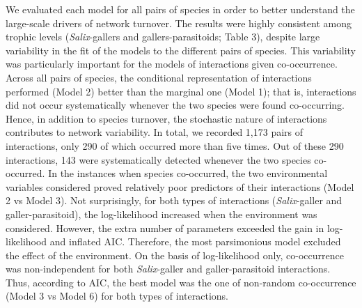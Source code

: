 \documentclass[12pt]{article}
\begin{document}
We evaluated each model for all pairs of species in order to better understand
the large-scale drivers of network turnover. The results were highly
consistent among trophic levels (\textit{Salix}-gallers and
gallers-parasitoids; Table 3), despite large variability in the fit
of the models to the different pairs of species. This variability was
particularly important for the models of interactions given co-occurrence.
Across all pairs of species, the conditional representation of interactions
performed (Model 2) better than the marginal one (Model 1); that is,
interactions did not occur systematically whenever the two species were found
co-occurring. Hence, in addition to species turnover, the stochastic nature of
interactions contributes to network variability. In total, we recorded 1,173
pairs of interactions, only 290 of which occurred more than five times. Out of
these 290 interactions, 143 were systematically detected whenever the two
species co-occurred. In the instances when species co-occurred, the two
environmental variables considered proved relatively poor predictors of their
interactions (Model 2 vs Model 3). Not surprisingly, for both types of
interactions (\textit{Salix}-galler and galler-parasitoid), the log-likelihood
increased when the environment was considered. However, the extra number of
parameters exceeded the gain in log-likelihood and inflated AIC. Therefore,
the most parsimonious model excluded the effect of the environment. On the
basis of log-likelihood only, co-occurrence was non-independent for both
\textit{Salix}-galler and galler-parasitoid interactions. Thus, according to
AIC, the best model was the one of non-random co-occurrence (Model 3 vs Model
6) for both types of interactions.

\end{document}
